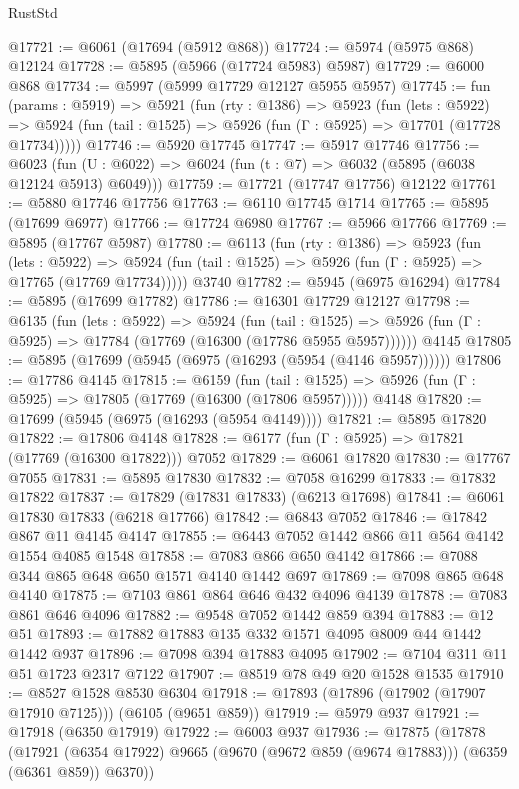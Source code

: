 \begin{lexlean}{RustStd}
\begin{coremodule}
{{@17721 := @6061 (@17694 (@5912 @868))
@17724 := @5974 (@5975 @868) @12124
@17728 := @5895 (@5966 (@17724 @5983) @5987)
@17729 := @6000 @868
@17734 := @5997 (@5999 @17729 @12127 @5955 @5957)
@17745 := fun (params : @5919) =>
  @5921
    (fun (rty : @1386) =>
    @5923
      (fun (lets : @5922) =>
      @5924 (fun (tail : @1525) => @5926 (fun (Γ : @5925) => @17701 (@17728 @17734)))))
@17746 := @5920 @17745
@17747 := @5917 @17746
@17756 := @6023
    (fun (U : @6022) => @6024 (fun (t : @7) => @6032 (@5895 (@6038 @12124 @5913) @6049)))
@17759 := @17721 (@17747 @17756) @12122
@17761 := @5880 @17746 @17756
@17763 := @6110 @17745 @1714
@17765 := @5895 (@17699 @6977)
@17766 := @17724 @6980
@17767 := @5966 @17766
@17769 := @5895 (@17767 @5987)
@17780 := @6113
    (fun (rty : @1386) =>
    @5923
      (fun (lets : @5922) =>
      @5924 (fun (tail : @1525) => @5926 (fun (Γ : @5925) => @17765 (@17769 @17734)))))
    @3740
@17782 := @5945 (@6975 @16294)
@17784 := @5895 (@17699 @17782)
@17786 := @16301 @17729 @12127
@17798 := @6135
    (fun (lets : @5922) =>
    @5924
      (fun (tail : @1525) =>
      @5926 (fun (Γ : @5925) => @17784 (@17769 (@16300 (@17786 @5955 @5957))))))
    @4145
@17805 := @5895 (@17699 (@5945 (@6975 (@16293 (@5954 (@4146 @5957))))))
@17806 := @17786 @4145
@17815 := @6159
    (fun (tail : @1525) => @5926 (fun (Γ : @5925) => @17805 (@17769 (@16300 (@17806 @5957)))))
    @4148
@17820 := @17699 (@5945 (@6975 (@16293 (@5954 @4149))))
@17821 := @5895 @17820
@17822 := @17806 @4148
@17828 := @6177 (fun (Γ : @5925) => @17821 (@17769 (@16300 @17822))) @7052
@17829 := @6061 @17820
@17830 := @17767 @7055
@17831 := @5895 @17830
@17832 := @7058 @16299
@17833 := @17832 @17822
@17837 := @17829 (@17831 @17833) (@6213 @17698)
@17841 := @6061 @17830 @17833 (@6218 @17766)
@17842 := @6843 @7052
@17846 := @17842 @867 @11 @4145 @4147
@17855 := @6443 @7052 @1442 @866 @11 @564 @4142 @1554 @4085 @1548
@17858 := @7083 @866 @650 @4142
@17866 := @7088 @344 @865 @648 @650 @1571 @4140 @1442 @697
@17869 := @7098 @865 @648 @4140
@17875 := @7103 @861 @864 @646 @432 @4096 @4139
@17878 := @7083 @861 @646 @4096
@17882 := @9548 @7052 @1442 @859 @394
@17883 := @12 @51
@17893 := @17882 @17883 @135 @332 @1571 @4095 @8009 @44 @1442 @1442 @937
@17896 := @7098 @394 @17883 @4095
@17902 := @7104 @311 @11 @51 @1723 @2317 @7122
@17907 := @8519 @78 @49 @20 @1528 @1535
@17910 := @8527 @1528 @8530 @6304
@17918 := @17893 (@17896 (@17902 (@17907 @17910 @7125))) (@6105 (@9651 @859))
@17919 := @5979 @937
@17921 := @17918 (@6350 @17919)
@17922 := @6003 @937
@17936 := @17875
    (@17878
      (@17921 (@6354 @17922) @9665 (@9670 (@9672 @859 (@9674 @17883))) (@6359 (@6361 @859)) @6370))
}}
\end{coremodule}
\end{lexlean}
